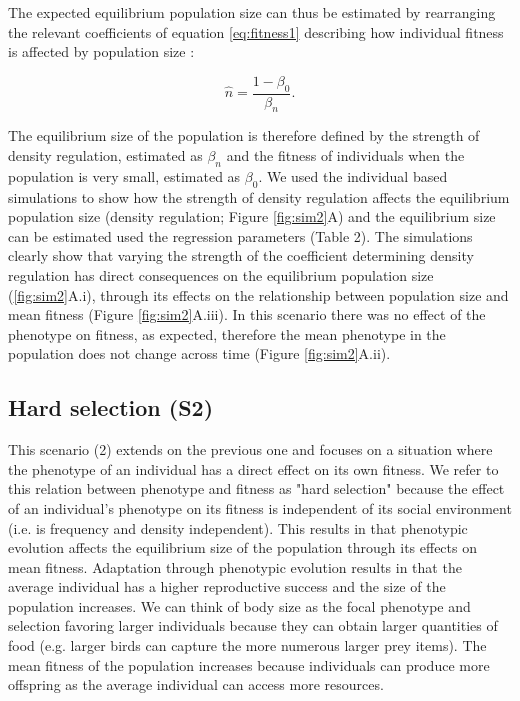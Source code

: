 \documentclass{article}
\begin{document}
The expected equilibrium population size can thus be estimated by rearranging the relevant coefficients of equation \ref{eq:fitness1} describing how individual fitness is affected by population size :

\begin{equation}\label{eq:equilibrium}
\hat{n}=\frac{1-\beta_{0}}{\beta_n}. 
\end{equation} 

\noindent The equilibrium size of the population is therefore defined by the strength of density regulation, estimated as $\beta_n$ and the fitness of individuals when the population is very small, estimated as $\beta_0$. We used the individual based simulations to show how the strength of density regulation affects the equilibrium population size (density regulation; Figure \ref{fig:sim2}A) and the equilibrium size can be estimated used the regression parameters (Table 2). The simulations clearly show that varying the strength of the coefficient determining density regulation has direct consequences on the equilibrium population size (\ref{fig:sim2}A.i), through its effects on the relationship between population size and mean fitness (Figure \ref{fig:sim2}A.iii). In this scenario there was no effect of the phenotype on fitness, as expected, therefore the mean phenotype in the population does not change across time (Figure \ref{fig:sim2}A.ii). 

\subsection{Hard selection (S2)}
This scenario (2) extends on the previous one and focuses on a situation where the phenotype of an individual has a direct effect on its own fitness. We refer to this relation between phenotype and fitness as "hard selection" \citep{Wallace1975, Bell2021} because the effect of an individual's phenotype on its fitness is independent of its social environment (i.e. is frequency and density independent). This results in that phenotypic evolution affects the equilibrium size of the population through its effects on mean fitness. Adaptation through phenotypic evolution results in that the average individual has a higher reproductive success and the size of the population increases. We can think of body size as the focal phenotype and selection favoring larger individuals because they can obtain larger quantities of food (e.g. larger birds can capture the more numerous larger prey items). The mean fitness of the population increases because individuals can produce more offspring as the average individual can access more resources. 
\end{document}
